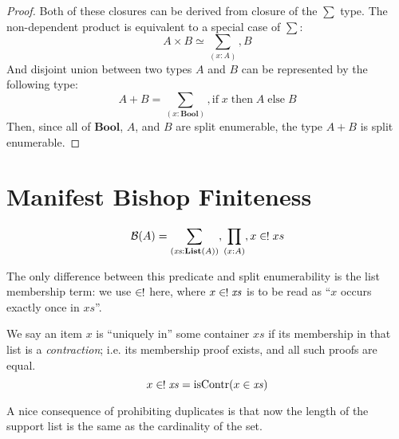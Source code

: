 \begin{proof}
  Both of these closures can be derived from closure of the \(\sum\) type.
  The non-dependent product is equivalent to a special case of \(\sum\):
  \begin{equation}
    A \times B \simeq \sum_{(x : A)} , B
  \end{equation}
  And disjoint union between two types \(A\) and \(B\) can be represented by the
  following type:
  \begin{equation}
    A + B = \sum_{(x : \mathbf{Bool})} , \text{if} \; x \; \text{then} \; A \; \text{else} \; B
  \end{equation}
  Then, since all of \(\mathbf{Bool}\), \(A\), and \(B\) are split enumerable,
  the type \(A + B\) is split enumerable.
\end{proof}
\section{Manifest Bishop Finiteness} \label{manifest-bishop}
\begin{rm-definition}
  \begin{equation}
    \mathcal{B}(A) = \sum_{(\mathit{xs} : \textbf{List}(A))} , \prod_{(x : A)} , x \inunique xs
  \end{equation}
\end{rm-definition}
The only difference between this predicate and split enumerability is the list
membership term: we use \(\inunique\) here, where \(x \inunique \mathit{xs}\) is
to be read as ``\(x\) occurs exactly once in \(\mathit{xs}\)''.
\begin{rm-definition}
  We say an item \(x\) is ``uniquely in'' some container \(\mathit{xs}\) if its
  membership in that list is a \emph{contraction}; i.e. its membership proof
  exists, and all such proofs are equal.
  \begin{equation}
    x \inunique \mathit{xs} = \text{isContr}(x \in \mathit{xs})
  \end{equation}
\end{rm-definition}

A nice consequence of prohibiting duplicates is that now the length of the
support list is the same as the cardinality of the set.
